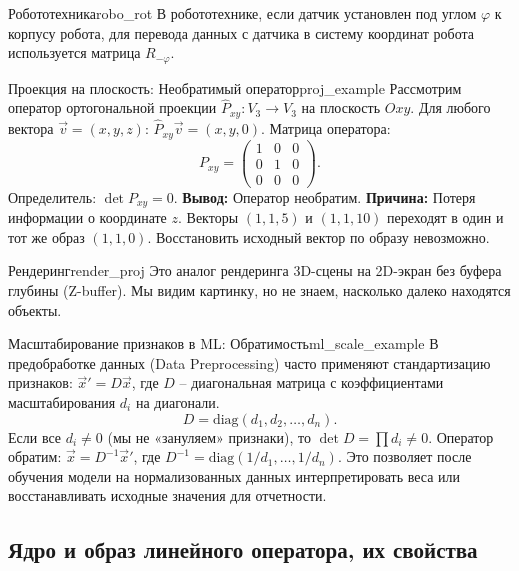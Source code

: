 \documentclass[12pt,a4paper]{article}
\begin{document}
\begin{remarkIT}{Робототехника}{robo_rot}
  В робототехнике, если датчик установлен под углом $\varphi$ к
  корпусу робота, для перевода данных с датчика в систему координат
  робота используется матрица $R_{-\varphi}$.
\end{remarkIT}

\begin{definition}{Проекция на плоскость: Необратимый оператор}{proj_example}
  Рассмотрим оператор ортогональной проекции $\hat{P}_{xy}: V_3 \to
  V_3$ на плоскость $Oxy$.
  Для любого вектора $\vec{v} = (x, y, z)$: $\hat{P}_{xy}\vec{v} = (x, y, 0)$.
  Матрица оператора:
  \[
    P_{xy} =
    \begin{pmatrix} 1 & 0 & 0 \\ 0 & 1 & 0 \\ 0 & 0 & 0
    \end{pmatrix}.
  \]
  Определитель: $\det P_{xy} = 0$.
  \textbf{Вывод:} Оператор необратим.
  \textbf{Причина:} Потеря информации о координате $z$. Векторы $(1,
  1, 5)$ и $(1, 1, 10)$ переходят в один и тот же образ $(1, 1, 0)$.
  Восстановить исходный вектор по образу невозможно.
\end{definition}

\begin{remarkIT}{Рендеринг}{render_proj}
  Это аналог рендеринга 3D-сцены на 2D-экран без буфера глубины
  (Z-buffer). Мы видим картинку, но не знаем, насколько далеко
  находятся объекты.
\end{remarkIT}

\begin{definition}{Масштабирование признаков в ML:
  Обратимость}{ml_scale_example}
  В предобработке данных (Data Preprocessing) часто применяют
  стандартизацию признаков: $\vec{x}' = D\vec{x}$, где $D$ --
  диагональная матрица с коэффициентами масштабирования $d_i$ на диагонали.
  \[
    D = \text{diag}(d_1, d_2, \dots, d_n).
  \]
  Если все $d_i \neq 0$ (мы не «зануляем» признаки), то $\det D =
  \prod d_i \neq 0$.
  Оператор обратим: $\vec{x} = D^{-1}\vec{x}'$, где $D^{-1} =
  \text{diag}(1/d_1, \dots, 1/d_n)$.
  Это позволяет после обучения модели на нормализованных данных
  интерпретировать веса или восстанавливать исходные значения для отчетности.
\end{definition}

\subsection{Ядро и образ линейного оператора, их свойства}
\end{document}
